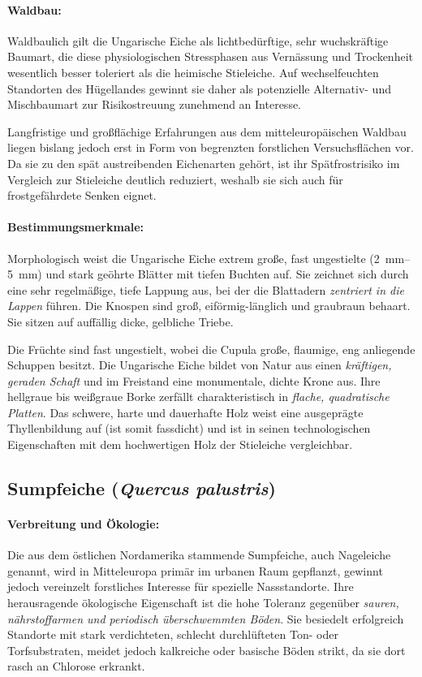 \documentclass[twocolumn, bibliography=totoc, abstract=true]{scrartcl}
\begin{document}
\paragraph{Waldbau:}
Waldbaulich gilt die Ungarische Eiche als lichtbedürftige, sehr wuchskräftige Baumart, die diese physiologischen Stressphasen aus Vernässung und Trockenheit wesentlich besser toleriert als die heimische Stieleiche. Auf wechselfeuchten Standorten des Hügellandes gewinnt sie daher als potenzielle Alternativ- und Mischbaumart zur Risikostreuung zunehmend an Interesse. 

Langfristige und großflächige Erfahrungen aus dem mitteleuropäischen Waldbau liegen bislang jedoch erst in Form von begrenzten forstlichen Versuchsflächen vor. Da sie zu den spät austreibenden Eichenarten gehört, ist ihr Spätfrostrisiko im Vergleich zur Stieleiche deutlich reduziert, weshalb sie sich auch für frostgefährdete Senken eignet.

\paragraph{Bestimmungsmerkmale:}
Morphologisch weist die Ungarische Eiche extrem große, fast ungestielte (\qtyrange{2}{5}{\mm}) und stark geöhrte Blätter mit tiefen Buchten auf. Sie zeichnet sich durch eine sehr regelmäßige, tiefe Lappung aus, bei der die Blattadern \emph{zentriert in die Lappen} führen. Die Knospen sind groß, eiförmig-länglich und graubraun behaart. Sie sitzen auf auffällig dicke, gelbliche Triebe.

Die Früchte sind fast ungestielt, wobei die Cupula große, flaumige, eng anliegende Schuppen besitzt. Die Ungarische Eiche bildet von Natur aus einen \emph{kräftigen, geraden Schaft} und im Freistand eine monumentale, dichte Krone aus. Ihre hellgraue bis weißgraue Borke zerfällt charakteristisch in \emph{flache, quadratische Platten}. Das schwere, harte und dauerhafte Holz weist eine ausgeprägte Thyllenbildung auf (ist somit fassdicht) und ist in seinen technologischen Eigenschaften mit dem hochwertigen Holz der Stieleiche vergleichbar.

\subsection{Sumpfeiche (\textit{Quercus palustris})}

\paragraph{Verbreitung und Ökologie:}
Die aus dem östlichen Nordamerika stammende Sumpfeiche, auch Nageleiche genannt, wird in Mitteleuropa primär im urbanen Raum gepflanzt, gewinnt jedoch vereinzelt forstliches Interesse für spezielle Nassstandorte. Ihre herausragende ökologische Eigenschaft ist die hohe Toleranz gegenüber \emph{sauren, nährstoffarmen und periodisch überschwemmten Böden}. Sie besiedelt erfolgreich Standorte mit stark verdichteten, schlecht durchlüfteten Ton- oder Torfsubstraten, meidet jedoch kalkreiche oder basische Böden strikt, da sie dort rasch an Chlorose erkrankt.
\end{document}
